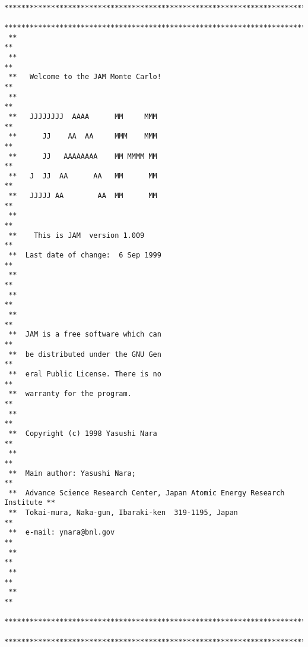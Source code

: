 \documentclass[]{article}
\begin{document}
\begin{verbatim}
 ******************************************************************************
 ******************************************************************************
 **                                                                          **
 **                                                                          **
 **   Welcome to the JAM Monte Carlo!                                        **
 **                                                                          **
 **   JJJJJJJJ  AAAA      MM     MMM                                         **
 **      JJ    AA  AA     MMM    MMM                                         **
 **      JJ   AAAAAAAA    MM MMMM MM                                         **
 **   J  JJ  AA      AA   MM      MM                                         **
 **   JJJJJ AA        AA  MM      MM                                         **
 **                                                                          **
 **    This is JAM  version 1.009                                            **
 **  Last date of change:  6 Sep 1999                                        **
 **                                                                          **
 **                                                                          **
 **                                                                          **
 **  JAM is a free software which can                                        **
 **  be distributed under the GNU Gen                                        **
 **  eral Public License. There is no                                        **
 **  warranty for the program.                                               **
 **                                                                          **
 **  Copyright (c) 1998 Yasushi Nara                                         **
 **                                                                          **
 **  Main author: Yasushi Nara;                                              **
 **  Advance Science Research Center, Japan Atomic Energy Research Institute **
 **  Tokai-mura, Naka-gun, Ibaraki-ken  319-1195, Japan                      **
 **  e-mail: ynara@bnl.gov                                                   **
 **                                                                          **
 **                                                                          **
 **                                                                          **
 ******************************************************************************
 ******************************************************************************



\end{verbatim}
\end{document}
